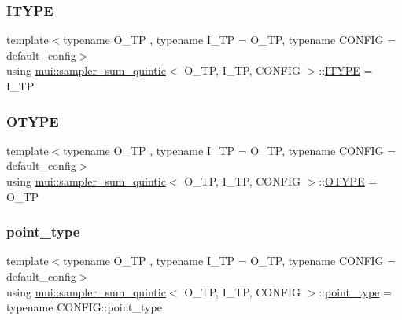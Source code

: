 \subsubsection{\texorpdfstring{I\+T\+Y\+PE}{ITYPE}}
{\footnotesize\ttfamily template$<$typename O\+\_\+\+TP , typename I\+\_\+\+TP  = O\+\_\+\+TP, typename C\+O\+N\+F\+IG  = default\+\_\+config$>$ \\
using \hyperlink{classmui_1_1sampler__sum__quintic}{mui\+::sampler\+\_\+sum\+\_\+quintic}$<$ O\+\_\+\+TP, I\+\_\+\+TP, C\+O\+N\+F\+IG $>$\+::\hyperlink{classmui_1_1sampler__sum__quintic_aefb0c5d19f1e834ee9d4c41efe31d222}{I\+T\+Y\+PE} =  I\+\_\+\+TP}

\mbox{\label{classmui_1_1sampler__sum__quintic_a524db204f563b4f3d1eedded2e39ba8b}} 
\subsubsection{\texorpdfstring{O\+T\+Y\+PE}{OTYPE}}
{\footnotesize\ttfamily template$<$typename O\+\_\+\+TP , typename I\+\_\+\+TP  = O\+\_\+\+TP, typename C\+O\+N\+F\+IG  = default\+\_\+config$>$ \\
using \hyperlink{classmui_1_1sampler__sum__quintic}{mui\+::sampler\+\_\+sum\+\_\+quintic}$<$ O\+\_\+\+TP, I\+\_\+\+TP, C\+O\+N\+F\+IG $>$\+::\hyperlink{classmui_1_1sampler__sum__quintic_a524db204f563b4f3d1eedded2e39ba8b}{O\+T\+Y\+PE} =  O\+\_\+\+TP}

\mbox{\label{classmui_1_1sampler__sum__quintic_a661c2038a21043ac8e41beeeb07978ad}} 
\subsubsection{\texorpdfstring{point\+\_\+type}{point\_type}}
{\footnotesize\ttfamily template$<$typename O\+\_\+\+TP , typename I\+\_\+\+TP  = O\+\_\+\+TP, typename C\+O\+N\+F\+IG  = default\+\_\+config$>$ \\
using \hyperlink{classmui_1_1sampler__sum__quintic}{mui\+::sampler\+\_\+sum\+\_\+quintic}$<$ O\+\_\+\+TP, I\+\_\+\+TP, C\+O\+N\+F\+IG $>$\+::\hyperlink{classmui_1_1sampler__sum__quintic_a661c2038a21043ac8e41beeeb07978ad}{point\+\_\+type} =  typename C\+O\+N\+F\+I\+G\+::point\+\_\+type}


